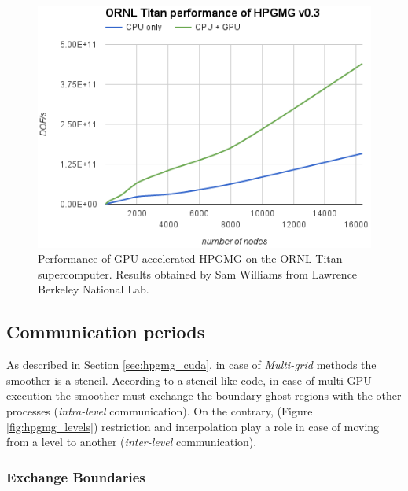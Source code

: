 \documentclass[conference]{IEEEtran}
\begin{document}
\begin{figure}[h]
\includegraphics[scale=0.7]{hpgmg_ornl_titan_perf_cuda.png}
\caption{Performance of GPU-accelerated HPGMG on the ORNL Titan supercomputer. Results obtained by Sam Williams from Lawrence Berkeley National Lab.}
\label{fig:hpgmg_ornl_bench}
\end{figure}


\subsection{Communication periods}\label{sec:hpgmg_cuda_communications}

As described in Section \ref{sec:hpgmg_cuda}, in case of \emph{Multi-grid} methods the smoother is a stencil. According to a stencil-like code, in case of multi-GPU execution the smoother must exchange the boundary ghost regions with the other processes (\emph{intra-level} communication). On the contrary, (Figure \ref{fig:hpgmg_levels}) restriction and interpolation play a role in case of moving from a level to another (\emph{inter-level} communication).

\subsubsection{Exchange Boundaries}
\end{document}
